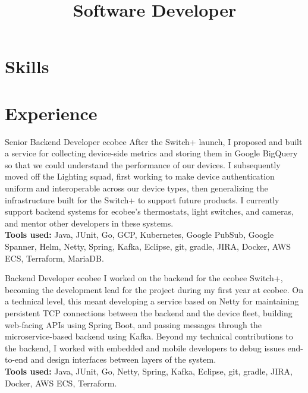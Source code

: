 \documentclass[11pt,letterpaper]{moderncv}
\title{Software Developer}
\begin{document}
\maketitle

\section{Skills}


\section{Experience}

{Senior Backend Developer}
{ecobee}
{}{}
{
After the Switch+ launch, I proposed and built a service for collecting device-side metrics and storing them in Google BigQuery so that we could understand the performance of our devices. I subsequently moved off the Lighting squad, first working to make device authentication uniform and interoperable across our device types, then generalizing the infrastructure built for the Switch+ to support future products. I currently support backend systems for ecobee's thermostats, light switches, and cameras, and mentor other developers in these systems. \\
\textbf{Tools used:} Java, JUnit, Go, GCP, Kubernetes, Google PubSub, Google Spanner, Helm, Netty, Spring, Kafka, Eclipse, git, gradle, JIRA, Docker, AWS ECS, Terraform, MariaDB.
}

{Backend Developer}
{ecobee}
{}{}
{
I worked on the backend for the ecobee Switch+, becoming the development lead for the project during my first year at ecobee. On a technical level, this meant developing a service based on Netty for maintaining persistent TCP connections between the backend and the device fleet, building web-facing APIs using Spring Boot, and passing messages through the microservice-based backend using Kafka. Beyond my technical contributions to the backend, I worked with embedded and mobile developers to debug issues end-to-end and design interfaces between layers of the system. \\
\textbf{Tools used:} Java, JUnit, Go, Netty, Spring, Kafka, Eclipse, git, gradle, JIRA, Docker, AWS ECS, Terraform.
}
\end{document}

